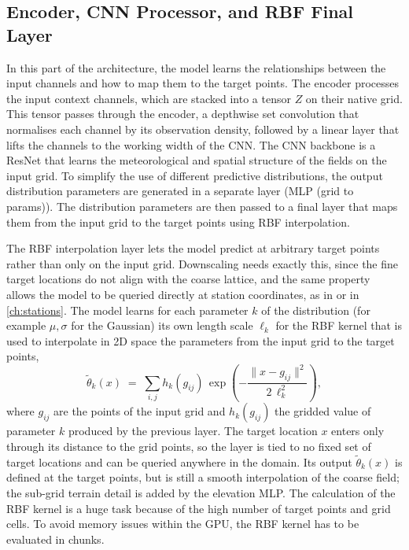 \subsection{Encoder, CNN Processor, and RBF Final Layer}\label{subsec:meth-backbone}
In this part of the architecture, the model learns the relationships between the input channels and how to map them to the target points. The encoder processes the input context channels, which are stacked into a tensor $Z$ on their native grid. This tensor passes through the encoder, a depthwise set convolution that normalises each channel by its observation density, followed by a linear layer that lifts the channels to the working width of the CNN. The CNN backbone is a ResNet that learns the meteorological and spatial structure of the fields on the input grid. To simplify the use of different predictive distributions, the output distribution parameters are generated in a separate layer (MLP (grid to params)). The distribution parameters are then passed to a final layer that maps them from the input grid to the target points using RBF interpolation.

The RBF interpolation layer lets the model predict at arbitrary target points rather than only on the input grid. Downscaling needs exactly this, since the fine target locations do not align with the coarse lattice, and the same property allows the model to be queried directly at station coordinates, as in \textcite{vaughan2022convcnp} or in \cref{ch:stations}.
The model learns for each parameter $k$ of the distribution (for example $\mu, \sigma$ for the Gaussian) its own length scale $\ell_k$ for the RBF kernel that is used to interpolate in 2D space the parameters from the input grid to the target points,
\begin{equation}
    \tilde{\theta}_k(x) \;=\; \sum_{i,j} h_k(g_{ij})\, \exp\!\left(-\frac{\lVert x - g_{ij} \rVert^{2}}{2\,\ell_k^{2}}\right),
\label{eq:rbf-interp}
\end{equation}
where $g_{ij}$ are the points of the input grid and $h_k(g_{ij})$ the gridded value of parameter $k$ produced by the previous layer. The target location $x$ enters only through its distance to the grid points, so the layer is tied to no fixed set of target locations and can be queried anywhere in the domain. Its output $\tilde{\theta}_k(x)$ is defined at the target points, but is still a smooth interpolation of the coarse field; the sub-grid terrain detail is added by the elevation MLP.
The calculation of the RBF kernel is a huge task because of the high number of target points and grid cells. To avoid memory issues within the GPU, the RBF kernel has to be  evaluated in chunks.

